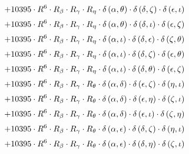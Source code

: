 \begin{subequations}
\begin{gather}
 \\[0.2em] \notag 		 + 10395 \cdot R^{6} \cdot R_{\beta{}} \cdot R_{\gamma{}} \cdot R_{\eta{}} \cdot \delta{}\left(\alpha{}, \theta{}\right) \cdot \delta{}\left(\delta{}, \zeta{}\right) \cdot \delta{}\left(\epsilon{}, \iota{}\right) 
 \\[0.2em] \notag 		 + 10395 \cdot R^{6} \cdot R_{\beta{}} \cdot R_{\gamma{}} \cdot R_{\eta{}} \cdot \delta{}\left(\alpha{}, \theta{}\right) \cdot \delta{}\left(\delta{}, \iota{}\right) \cdot \delta{}\left(\epsilon{}, \zeta{}\right) 
 \\[0.2em] \notag 		 + 10395 \cdot R^{6} \cdot R_{\beta{}} \cdot R_{\gamma{}} \cdot R_{\eta{}} \cdot \delta{}\left(\alpha{}, \iota{}\right) \cdot \delta{}\left(\delta{}, \epsilon{}\right) \cdot \delta{}\left(\zeta{}, \theta{}\right) 
 \\[0.2em] \notag 		 + 10395 \cdot R^{6} \cdot R_{\beta{}} \cdot R_{\gamma{}} \cdot R_{\eta{}} \cdot \delta{}\left(\alpha{}, \iota{}\right) \cdot \delta{}\left(\delta{}, \zeta{}\right) \cdot \delta{}\left(\epsilon{}, \theta{}\right) 
 \\[0.2em] \notag 		 + 10395 \cdot R^{6} \cdot R_{\beta{}} \cdot R_{\gamma{}} \cdot R_{\eta{}} \cdot \delta{}\left(\alpha{}, \iota{}\right) \cdot \delta{}\left(\delta{}, \theta{}\right) \cdot \delta{}\left(\epsilon{}, \zeta{}\right) 
 \\[0.2em] \notag 		 + 10395 \cdot R^{6} \cdot R_{\beta{}} \cdot R_{\gamma{}} \cdot R_{\theta{}} \cdot \delta{}\left(\alpha{}, \delta{}\right) \cdot \delta{}\left(\epsilon{}, \zeta{}\right) \cdot \delta{}\left(\eta{}, \iota{}\right) 
 \\[0.2em] \notag 		 + 10395 \cdot R^{6} \cdot R_{\beta{}} \cdot R_{\gamma{}} \cdot R_{\theta{}} \cdot \delta{}\left(\alpha{}, \delta{}\right) \cdot \delta{}\left(\epsilon{}, \eta{}\right) \cdot \delta{}\left(\zeta{}, \iota{}\right) 
 \\[0.2em] \notag 		 + 10395 \cdot R^{6} \cdot R_{\beta{}} \cdot R_{\gamma{}} \cdot R_{\theta{}} \cdot \delta{}\left(\alpha{}, \delta{}\right) \cdot \delta{}\left(\epsilon{}, \iota{}\right) \cdot \delta{}\left(\zeta{}, \eta{}\right) 
 \\[0.2em] \notag 		 + 10395 \cdot R^{6} \cdot R_{\beta{}} \cdot R_{\gamma{}} \cdot R_{\theta{}} \cdot \delta{}\left(\alpha{}, \epsilon{}\right) \cdot \delta{}\left(\delta{}, \zeta{}\right) \cdot \delta{}\left(\eta{}, \iota{}\right) 
 \\[0.2em] \notag 		 + 10395 \cdot R^{6} \cdot R_{\beta{}} \cdot R_{\gamma{}} \cdot R_{\theta{}} \cdot \delta{}\left(\alpha{}, \epsilon{}\right) \cdot \delta{}\left(\delta{}, \eta{}\right) \cdot \delta{}\left(\zeta{}, \iota{}\right) 

\end{gather}
\end{subequations}
